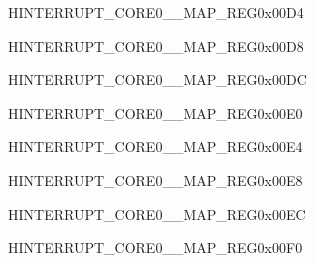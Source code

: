 \begin{register}{H}{INTERRUPT\_CORE0\_\_MAP\_REG}{0x00D4}\label{regdesc:INTERRUPTCORE0TG1T0INTMAPREG}
\end{register}
\vspace{-3em}

\begin{register}{H}{INTERRUPT\_CORE0\_\_MAP\_REG}{0x00D8}\label{regdesc:INTERRUPTCORE0TG1T1INTMAPREG}
\end{register}
\vspace{-3em}

\begin{register}{H}{INTERRUPT\_CORE0\_\_MAP\_REG}{0x00DC}\label{regdesc:INTERRUPTCORE0TG1WDTINTMAPREG}
\end{register}
\vspace{-3em}

\begin{register}{H}{INTERRUPT\_CORE0\_\_MAP\_REG}{0x00E0}\label{regdesc:INTERRUPTCORE0CACHEIAINTMAPREG}
\end{register}
\vspace{-3em}

\begin{register}{H}{INTERRUPT\_CORE0\_\_MAP\_REG}{0x00E4}\label{regdesc:INTERRUPTCORE0SYSTIMERTARGET0INTMAPREG}
\end{register}
\vspace{-3em}

\begin{register}{H}{INTERRUPT\_CORE0\_\_MAP\_REG}{0x00E8}\label{regdesc:INTERRUPTCORE0SYSTIMERTARGET1INTMAPREG}
\end{register}
\vspace{-3em}

\begin{register}{H}{INTERRUPT\_CORE0\_\_MAP\_REG}{0x00EC}\label{regdesc:INTERRUPTCORE0SYSTIMERTARGET2INTMAPREG}
\end{register}
\vspace{-3em}

\begin{register}{H}{INTERRUPT\_CORE0\_\_MAP\_REG}{0x00F0}\label{regdesc:INTERRUPTCORE0SPIMEMREJECTINTRMAPREG}
\end{register}
\vspace{-3em}

